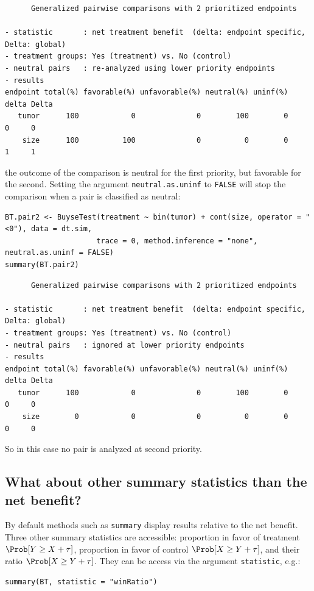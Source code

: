\documentclass[12pt]{article}
\begin{document}
\begin{verbatim}
      Generalized pairwise comparisons with 2 prioritized endpoints

- statistic       : net treatment benefit  (delta: endpoint specific, Delta: global) 
- treatment groups: Yes (treatment) vs. No (control) 
- neutral pairs   : re-analyzed using lower priority endpoints
- results
endpoint total(%) favorable(%) unfavorable(%) neutral(%) uninf(%) delta Delta
   tumor      100            0              0        100        0     0     0
    size      100          100              0          0        0     1     1
\end{verbatim}


the outcome of the comparison is neutral for the first priority, but
favorable for the second. Setting the argument \texttt{neutral.as.uninf} to
\texttt{FALSE} will stop the comparison when a pair is classified as neutral:
\lstset{language=r,label= ,caption= ,captionpos=b,numbers=none}
\begin{lstlisting}
BT.pair2 <- BuyseTest(treatment ~ bin(tumor) + cont(size, operator = "<0"), data = dt.sim,
                     trace = 0, method.inference = "none", neutral.as.uninf = FALSE)
summary(BT.pair2)
\end{lstlisting}

\begin{verbatim}
      Generalized pairwise comparisons with 2 prioritized endpoints

- statistic       : net treatment benefit  (delta: endpoint specific, Delta: global) 
- treatment groups: Yes (treatment) vs. No (control) 
- neutral pairs   : ignored at lower priority endpoints
- results
endpoint total(%) favorable(%) unfavorable(%) neutral(%) uninf(%) delta Delta
   tumor      100            0              0        100        0     0     0
    size        0            0              0          0        0     0     0
\end{verbatim}


So in this case no pair is analyzed at second priority.

\clearpage

\subsection{What about other summary statistics than the net benefit?}
\label{sec:org8a277b9}

By default methods such as \texttt{summary} display results relative to the
net benefit. Three other summary statistics are accessible: proportion
in favor of treatment \(\Prob[Y\geq X + \tau]\), proportion in favor
of control \(\Prob[X\geq Y + \tau]\), and their ratio \(\Prob[X\geq
Y + \tau]\). They can be access via the argument
\texttt{statistic}, e.g.:
\lstset{language=r,label= ,caption= ,captionpos=b,numbers=none}
\begin{lstlisting}
summary(BT, statistic = "winRatio")
\end{lstlisting}
\end{document}
